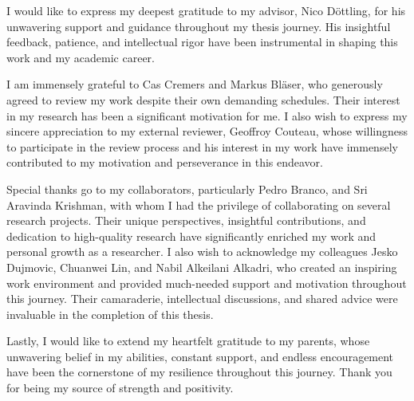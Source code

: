 
 I would like to express my deepest gratitude to my advisor, Nico D\"ottling, for his unwavering support and guidance throughout my thesis journey. His insightful feedback, patience, and intellectual rigor have been instrumental in shaping this work and my academic career.

I am immensely grateful to Cas Cremers and Markus Bl\"aser, who generously agreed to review my work despite their own demanding schedules. Their interest in my research has been a significant motivation for me. 
I also wish to express my sincere appreciation to my external reviewer, Geoffroy Couteau, whose willingness to participate in the review process and his interest in my work have immensely contributed to my motivation and perseverance in this endeavor. 

Special thanks go to my collaborators, particularly Pedro Branco, and Sri Aravinda Krishman, with whom I had the privilege of collaborating on several research projects. Their unique perspectives, insightful contributions, and dedication to high-quality research have significantly enriched my work and personal growth as a researcher.
I also wish to acknowledge my colleagues Jesko Dujmovic, Chuanwei Lin, and Nabil Alkeilani Alkadri, who created an inspiring work environment and provided much-needed support and motivation throughout this journey. Their camaraderie, intellectual discussions, and shared advice were invaluable in the completion of this thesis.

Lastly, I would like to extend my heartfelt gratitude to my parents, whose unwavering belief in my abilities, constant support, and endless encouragement have been the cornerstone of my resilience throughout this journey. Thank you for being my source of strength and positivity.
